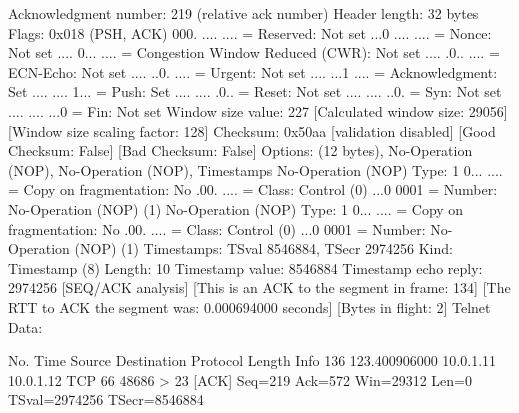     Acknowledgment number: 219    (relative ack number)
    Header length: 32 bytes
    Flags: 0x018 (PSH, ACK)
        000. .... .... = Reserved: Not set
        ...0 .... .... = Nonce: Not set
        .... 0... .... = Congestion Window Reduced (CWR): Not set
        .... .0.. .... = ECN-Echo: Not set
        .... ..0. .... = Urgent: Not set
        .... ...1 .... = Acknowledgment: Set
        .... .... 1... = Push: Set
        .... .... .0.. = Reset: Not set
        .... .... ..0. = Syn: Not set
        .... .... ...0 = Fin: Not set
    Window size value: 227
    [Calculated window size: 29056]
    [Window size scaling factor: 128]
    Checksum: 0x50aa [validation disabled]
        [Good Checksum: False]
        [Bad Checksum: False]
    Options: (12 bytes), No-Operation (NOP), No-Operation (NOP), Timestamps
        No-Operation (NOP)
            Type: 1
                0... .... = Copy on fragmentation: No
                .00. .... = Class: Control (0)
                ...0 0001 = Number: No-Operation (NOP) (1)
        No-Operation (NOP)
            Type: 1
                0... .... = Copy on fragmentation: No
                .00. .... = Class: Control (0)
                ...0 0001 = Number: No-Operation (NOP) (1)
        Timestamps: TSval 8546884, TSecr 2974256
            Kind: Timestamp (8)
            Length: 10
            Timestamp value: 8546884
            Timestamp echo reply: 2974256
    [SEQ/ACK analysis]
        [This is an ACK to the segment in frame: 134]
        [The RTT to ACK the segment was: 0.000694000 seconds]
        [Bytes in flight: 2]
Telnet
    Data: 

No.     Time           Source                Destination           Protocol Length Info
    136 123.400906000  10.0.1.11             10.0.1.12             TCP      66     48686 > 23 [ACK] Seq=219 Ack=572 Win=29312 Len=0 TSval=2974256 TSecr=8546884

